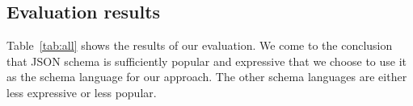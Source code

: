 \subsection{Evaluation results}\label{subsec:evaluation-results}

Table~\ref{tab:all} shows the results of our evaluation.
We come to the conclusion that JSON schema is sufficiently popular and expressive that we choose to use it as the schema language for our approach.
The other schema languages are either less expressive or less popular.



%
%
